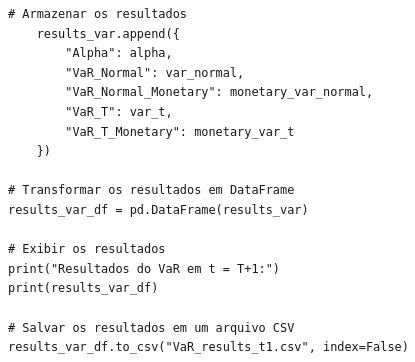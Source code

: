\documentclass[a4paper, 12pt]{article}
\begin{document}
\begin{lstlisting}[style=python]
    # Armazenar os resultados
    results_var.append({
        "Alpha": alpha,
        "VaR_Normal": var_normal,
        "VaR_Normal_Monetary": monetary_var_normal,
        "VaR_T": var_t,
        "VaR_T_Monetary": monetary_var_t
    })

# Transformar os resultados em DataFrame
results_var_df = pd.DataFrame(results_var)

# Exibir os resultados
print("Resultados do VaR em t = T+1:")
print(results_var_df)

# Salvar os resultados em um arquivo CSV
results_var_df.to_csv("VaR_results_t1.csv", index=False)

\end{lstlisting}



\newpage
\end{document}
